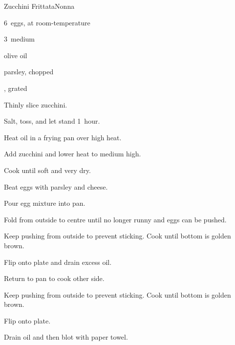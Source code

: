\begin{recipe}{Zucchini Frittata}{Nonna}{}

\begin{ingredients}
\item 6~eggs, at room-temperature
\item 3~medium 
\item olive oil
\item parsley, chopped
\item \C{\half} , grated
\end{ingredients}

\begin{directions}
\item Thinly slice zucchini.
\item Salt, toss, and let stand 1~hour.
\item Heat oil in a  frying pan over high heat.
\item Add zucchini and lower heat to medium high.
\item Cook until soft and very dry.
\item Beat eggs with parsley and cheese.
\item Pour egg mixture into pan.
\item Fold from outside to centre until no longer runny and eggs can be pushed.
\item Keep pushing from outside to prevent sticking. Cook until bottom is golden brown.
\item Flip onto plate and drain excess oil.
\item Return to pan to cook other side.
\item Keep pushing from outside to prevent sticking. Cook until bottom is golden brown.
\item Flip onto plate.
\item Drain oil and then blot with paper towel.
\end{directions}

\end{recipe}
